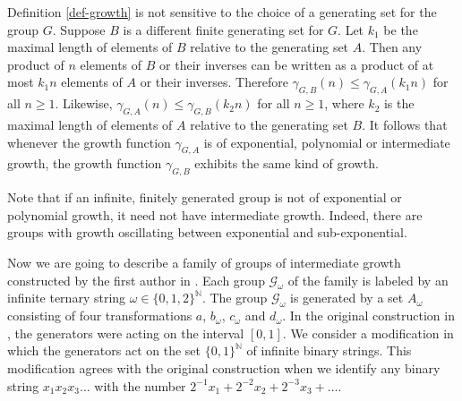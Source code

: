 \documentclass[12pt]{article}
\theoremstyle{definition}
\def\bN{\mathbb{N}}
\def\cG{\mathcal{G}}
\def\ga{\gamma}
\def\om{\omega}
\begin{document}
Definition \ref{def-growth} is not sensitive to the choice of a generating 
set for the group $G$.  Suppose $B$ is a different finite generating set 
for $G$.  Let $k_1$ be the maximal length of elements of $B$ relative to 
the generating set $A$.  Then any product of $n$ elements of $B$ or their 
inverses can be written as a product of at most $k_1n$ elements of $A$ or 
their inverses.  Therefore $\ga_{G,B}(n)\le\ga_{G,A}(k_1n)$ for all 
$n\ge1$.  Likewise, $\ga_{G,A}(n)\le\ga_{G,B}(k_2n)$ for all $n\ge1$, where 
$k_2$ is the maximal length of elements of $A$ relative to the generating 
set $B$.  It follows that whenever the growth function $\ga_{G,A}$ is of 
exponential, polynomial or intermediate growth, the growth function 
$\ga_{G,B}$ exhibits the same kind of growth.

Note that if an infinite, finitely generated group is not of exponential or 
polynomial growth, it need not have intermediate growth.  Indeed, there are 
groups with growth oscillating between exponential and sub-exponential.

Now we are going to describe a family of groups of intermediate growth 
constructed by the first author in \cite{Grig84}.  Each group $\cG_\om$ of 
the family is labeled by an infinite ternary string
$\om\in\{0,1,2\}^{\bN}$.  The group $\cG_\om$ is generated by a set $A_\om$ 
consisting of four transformations $a$, $b_\om$, $c_\om$ and $d_\om$.  In 
the original construction in \cite{Grig84}, the generators were acting on 
the interval $[0,1]$.  We consider a modification in which the generators 
act on the set $\{0,1\}^{\bN}$ of infinite binary strings.  This 
modification agrees with the original construction when we identify any 
binary string $x_1x_2x_3\ldots$ with the number 
$2^{-1}x_1+2^{-2}x_2+2^{-3}x_3+\dots$.
\end{document}
